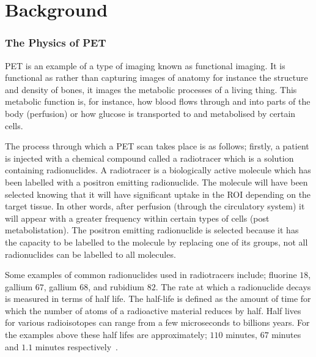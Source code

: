 \chapter{Background} \label{background}
    \blindtext
    
        \blindtext
        
        \subsection{The Physics of PET} \label{the_physics_of_pet}
            
            \gls{PET} is an example of a type of imaging known as functional imaging. It is functional as rather than capturing images of anatomy for instance the structure and density of bones, it images the metabolic processes of a living thing. This metabolic function is, for instance, how blood flows through and into parts of the body (perfusion) or how glucose is transported to and metabolised by certain cells.
            
            The process through which a \gls{PET} scan takes place is as follows; firstly, a patient is injected with a chemical compound called a radiotracer which is a solution containing radionuclides. A radiotracer is a biologically active molecule which has been labelled with a positron emitting radionuclide. The molecule will have been selected knowing that it will have significant uptake in the \gls{ROI} depending on the target tissue. In other words, after perfusion (through the circulatory system) it will appear with a greater frequency within certain types of cells (post metabolistation). The positron emitting radionuclide is selected because it has the capacity to be labelled to the molecule by replacing one of its groups, not all radionuclides can be labelled to all molecules. %
            
            Some examples of common radionuclides used in radiotracers include; fluorine $18$, gallium $67$, gallium $68$, and rubidium $82$. The rate at which a radionuclide decays is measured in terms of half life. The half-life is defined as the amount of time for which the number of atoms of a radioactive material reduces by half. Half lives for various radioisotopes can range from a few microseconds to billions years. For the examples above these half lifes are approximately; $110$ minutes, $67$ minutes and $1.1$ minutes respectively~.
            
